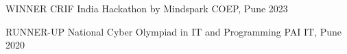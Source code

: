 



\begin{cvhonors}

  \cvhonor
    {WINNER} %
    {CRIF India Hackathon by Mindspark} %
    {COEP, Pune} %
    {2023} %

  \cvhonor
    {RUNNER-UP} %
    {National Cyber Olympiad in IT and Programming} %
    {PAI IT, Pune} %
    {2020} %


\end{cvhonors}


